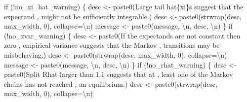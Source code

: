 \documentclass[
  letterpaper,
  DIV=11,
  numbers=noendperiod]{scrartcl}
\newenvironment{Shaded}{\begin{snugshade}}{\end{snugshade}}
\newcommand{\CharTok}[1]{\textcolor[rgb]{0.13,0.47,0.30}{#1}}
\newcommand{\ControlFlowTok}[1]{\textcolor[rgb]{0.00,0.23,0.31}{#1}}
\newcommand{\DecValTok}[1]{\textcolor[rgb]{0.68,0.00,0.00}{#1}}
\newcommand{\NormalTok}[1]{\textcolor[rgb]{0.00,0.23,0.31}{#1}}
\newcommand{\OperatorTok}[1]{\textcolor[rgb]{0.37,0.37,0.37}{#1}}
\newcommand{\SpecialCharTok}[1]{\textcolor[rgb]{0.37,0.37,0.37}{#1}}
\newcommand{\StringTok}[1]{\textcolor[rgb]{0.13,0.47,0.30}{#1}}
\begin{document}
\begin{Shaded}
\begin{Highlighting}[]
  \ControlFlowTok{if}\NormalTok{ (}\OperatorTok{!}\NormalTok{no\_xi\_hat\_warning) \{}
\NormalTok{    desc }\OperatorTok{\textless{}{-}}\NormalTok{ paste0(}\StringTok{\textquotesingle{}Large tail hat}\SpecialCharTok{\{xi\}}\StringTok{s suggest that the expectand \textquotesingle{}}\NormalTok{,}
                   \StringTok{\textquotesingle{}might not be sufficiently integrable.\textquotesingle{}}\NormalTok{)}
\NormalTok{    desc }\OperatorTok{\textless{}{-}}\NormalTok{ paste0(strwrap(desc, max\_width, }\DecValTok{0}\NormalTok{), collapse}\OperatorTok{=}\StringTok{\textquotesingle{}}\CharTok{\textbackslash{}n}\StringTok{\textquotesingle{}}\NormalTok{)}
\NormalTok{    message }\OperatorTok{\textless{}{-}}\NormalTok{ paste0(message, }\StringTok{\textquotesingle{}}\CharTok{\textbackslash{}n}\StringTok{\textquotesingle{}}\NormalTok{, desc, }\StringTok{\textquotesingle{}}\CharTok{\textbackslash{}n}\StringTok{\textquotesingle{}}\NormalTok{)}
\NormalTok{  \}}
  \ControlFlowTok{if}\NormalTok{ (}\OperatorTok{!}\NormalTok{no\_zvar\_warning) \{}
\NormalTok{    desc }\OperatorTok{\textless{}{-}}\NormalTok{ paste0(}\StringTok{\textquotesingle{}If the expectands are not constant then zero \textquotesingle{}}\NormalTok{,}
                   \StringTok{\textquotesingle{}empirical variance suggests that the Markov \textquotesingle{}}\NormalTok{,}
                   \StringTok{\textquotesingle{}transitions may be misbehaving.\textquotesingle{}}\NormalTok{)}
\NormalTok{    desc }\OperatorTok{\textless{}{-}}\NormalTok{ paste0(strwrap(desc, max\_width, }\DecValTok{0}\NormalTok{), collapse}\OperatorTok{=}\StringTok{\textquotesingle{}}\CharTok{\textbackslash{}n}\StringTok{\textquotesingle{}}\NormalTok{)}
\NormalTok{    message }\OperatorTok{\textless{}{-}}\NormalTok{ paste0(message, }\StringTok{\textquotesingle{}}\CharTok{\textbackslash{}n}\StringTok{\textquotesingle{}}\NormalTok{, desc, }\StringTok{\textquotesingle{}}\CharTok{\textbackslash{}n}\StringTok{\textquotesingle{}}\NormalTok{)}
\NormalTok{  \}}
  \ControlFlowTok{if}\NormalTok{ (}\OperatorTok{!}\NormalTok{no\_rhat\_warning) \{}
\NormalTok{    desc }\OperatorTok{\textless{}{-}}\NormalTok{ paste0(}\StringTok{\textquotesingle{}Split Rhat larger than 1.1 suggests that at \textquotesingle{}}\NormalTok{,}
                   \StringTok{\textquotesingle{}least one of the Markov chains has not reached \textquotesingle{}}\NormalTok{,}
                   \StringTok{\textquotesingle{}an equilibrium.\textquotesingle{}}\NormalTok{)}
\NormalTok{    desc }\OperatorTok{\textless{}{-}}\NormalTok{ paste0(strwrap(desc, max\_width, }\DecValTok{0}\NormalTok{), collapse}\OperatorTok{=}\StringTok{\textquotesingle{}}\CharTok{\textbackslash{}n}\StringTok{\textquotesingle{}}\NormalTok{)}

\end{Highlighting}
\end{Shaded}
\end{document}

